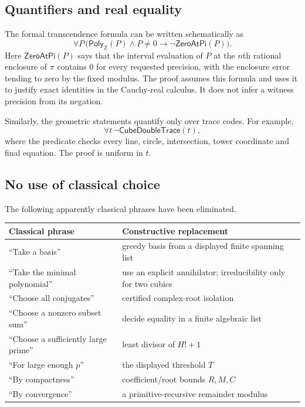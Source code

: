\documentclass[11pt]{article}
\newcommand{\Z}{\mathbb{Z}}
\newcommand{\poly}{\mathsf{Poly}}
\begin{document}
\subsection{Quantifiers and real equality}

The formal transcendence formula can be written schematically as
\[
  \forall P\,\bigl(\poly_{\Z}(P)\wedge P\ne0
       \to \neg\mathsf{ZeroAtPi}(P)\bigr).
\]
Here $\mathsf{ZeroAtPi}(P)$ says that the interval evaluation of $P$ at the $n$th rational enclosure of $\pi$ contains $0$ for every requested precision, with the enclosure error tending to zero by the fixed modulus.  The proof assumes this formula and uses it to justify exact identities in the Cauchy-real calculus.  It does not infer a witness precision from its negation.

Similarly, the geometric statements quantify only over trace codes.  For example,
\[
  \forall t\,\neg\mathsf{CubeDoubleTrace}(t),
\]
where the predicate checks every line, circle, intersection, tower coordinate and final equation.  The proof is uniform in $t$.

\subsection{No use of classical choice}

The following apparently classical phrases have been eliminated.

\begin{center}
\begin{tabular}{@{}ll@{}}
\toprule
Classical phrase & Constructive replacement \\
\midrule
``Take a basis'' & greedy basis from a displayed finite spanning list \\
``Take the minimal polynomial'' & use an explicit annihilator; irreducibility only for two cubics \\
``Choose all conjugates'' & certified complex-root isolation \\
``Choose a nonzero subset sum'' & decide equality in a finite algebraic list \\
``Choose a sufficiently large prime'' & least divisor of $H!+1$ \\
``For large enough $p$'' & the displayed threshold $T$ \\
``By compactness'' & coefficient/root bounds $R,M,C$ \\
``By convergence'' & a primitive-recursive remainder modulus \\
\bottomrule
\end{tabular}
\end{center}
\end{document}
